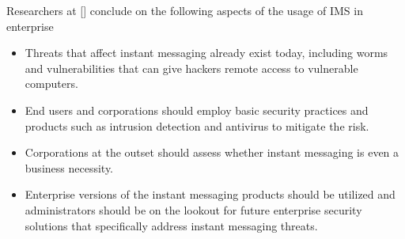 Researchers at [\cite{hindocha2003malicious}] conclude on the following aspects of the usage of IMS in enterprise

\begin{itemize}
    \item Threats that affect instant messaging already exist today, including worms and vulnerabilities that can
    give hackers remote access to vulnerable computers.
    \item End users and corporations should employ basic security practices and products such as
    intrusion detection and antivirus to mitigate the risk.
    \item Corporations at the outset should assess whether instant messaging is even a business necessity.
    \item Enterprise versions of
    the instant messaging products should be utilized and administrators should be on the lookout for
    future enterprise security solutions that specifically address instant messaging threats.
\end{itemize}